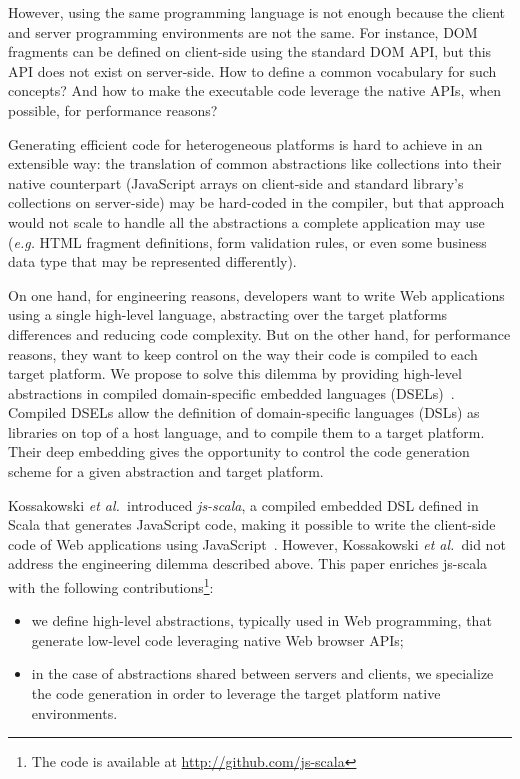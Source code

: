 \documentclass[preprint]{sigplanconf}
\newcommand{\eg}{\emph{e.g.}}
\newcommand{\etal}{\emph{et al.~}}
\begin{document}
However, using the same programming language is not enough because the client and server programming
environments are not the same. For instance, DOM fragments can be defined on client-side using the
standard DOM API, but this API does not exist on server-side. How to define a common vocabulary for
such concepts? And how to make the executable code leverage the native APIs, when possible, for
performance reasons?

Generating efficient code for heterogeneous platforms is hard to achieve in an extensible way: the
translation of common abstractions like collections into their native counterpart (JavaScript arrays
on client-side and standard library's collections on server-side) may be hard-coded in the compiler,
but that approach would not scale to handle all the abstractions a complete application may use
(\eg{} HTML fragment definitions, form validation rules, or even some business data type that may be
represented differently).

On one hand, for engineering reasons, developers want to write Web applications using a single
high-level language, abstracting over the target platforms differences and reducing code complexity.
But on the other hand, for performance reasons, they want to keep control on the way their code is
compiled to each target platform. We propose to solve this dilemma by providing high-level
abstractions in compiled domain-specific embedded languages (DSELs)~\cite{Hudak96_DSEL,
Elliott2003_Compiling}. Compiled DSELs allow the definition of domain-specific languages (DSLs) as
libraries on top of a host language, and to compile them to a target platform. Their deep embedding
gives the opportunity to control the code generation scheme for a given abstraction and target
platform.

Kossakowski \etal introduced \emph{js-scala}, a compiled embedded DSL defined in Scala that
generates JavaScript code, making it possible to write the client-side code of Web applications
using JavaScript~\cite{Kossakowski12_JsDESL}. However, Kossakowski \etal did not address the
engineering dilemma described above. This paper enriches js-scala with the following
contributions\footnote{The code is available at
\href{http://github.com/js-scala}{http://github.com/js-scala}}:

\begin{itemize}
 \item we define high-level abstractions, typically used in Web programming, that generate low-level
code leveraging native Web browser APIs;
 \item in the case of abstractions shared between servers and clients, we specialize the code
generation in order to leverage the target platform native environments.
\end{itemize}
\end{document}
